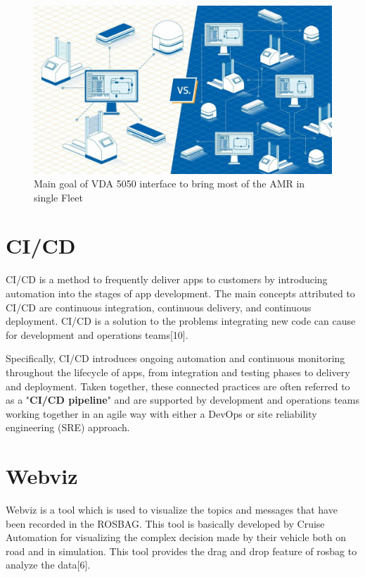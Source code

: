 \begin{figure}[h]
	\begin{center}
		\includegraphics[height=10 cm,width=\linewidth]{images/vda.jpg}
		\caption{Main goal of VDA 5050 interface to bring most of the AMR in single Fleet}
	\end{center}
\end{figure}
\pagebreak
\section{CI/CD}

CI/CD is a method to frequently deliver apps to customers by introducing automation into the stages of app development. The main concepts attributed to CI/CD are continuous integration, continuous delivery, and continuous deployment. CI/CD is a solution to the problems integrating new code can cause for development and operations teams[10].

Specifically, CI/CD introduces ongoing automation and continuous monitoring throughout the lifecycle of apps, from integration and testing phases to delivery and deployment. Taken together, these connected practices are often referred to as a "\textbf{CI/CD pipeline}" and are supported by development and operations teams working together in an agile way with either a DevOps or site reliability engineering (SRE) approach.
\section{Webviz}

Webviz is a tool which is used to visualize the topics and messages that have been recorded in the ROSBAG. This tool is basically developed by Cruise Automation for visualizing the complex decision made by their vehicle both on road and in simulation. This tool provides the drag and drop feature of rosbag to analyze the data[6].

